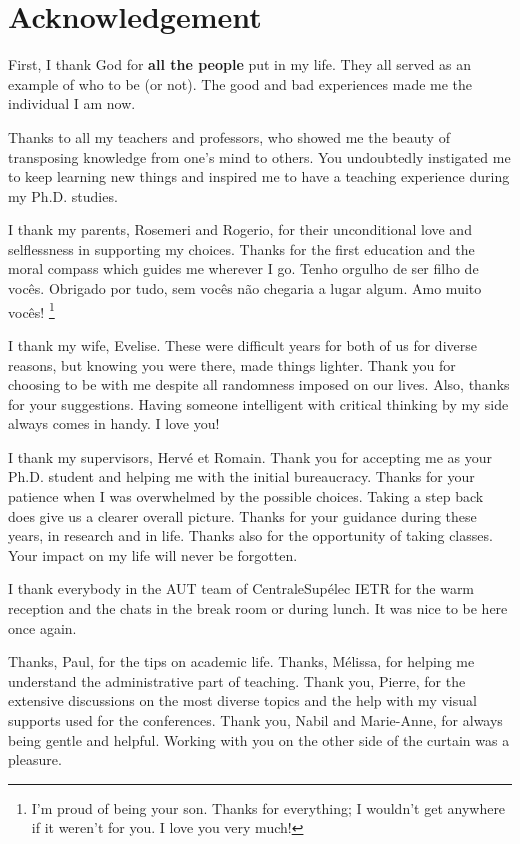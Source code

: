 \documentclass[../main.tex]{subfiles}
\begin{document}
\chapter*{Acknowledgement}

First, I thank God for \textbf{all the people} put in my life.
They all served as an example of who to be (or not).
The good and bad experiences made me the individual I am now.

Thanks to all my teachers and professors, who showed me the beauty of transposing knowledge from one's mind to others.
You undoubtedly instigated me to keep learning new things and inspired me to have a teaching experience during my Ph.D. studies.

I thank my parents, Rosemeri and Rogerio, for their unconditional love and selflessness in supporting my choices.
Thanks for the first education and the moral compass which guides me wherever I go. Tenho orgulho de ser filho de vocês. Obrigado por tudo, sem vocês não chegaria a lugar algum. Amo muito vocês! \footnote{I'm proud of being your son. Thanks for everything; I wouldn't get anywhere if it weren't for you. I love you very much!}

I thank my wife, Evelise.
These were difficult years for both of us for diverse reasons, but knowing you were there, made things lighter.
Thank you for choosing to be with me despite all randomness imposed on our lives.
Also, thanks for your suggestions. Having someone intelligent with critical thinking by my side always comes in handy.
I love you!

I thank my supervisors, Hervé et Romain.
Thank you for accepting me as your Ph.D. student and helping me with the initial bureaucracy.
Thanks for your patience when I was overwhelmed by the possible choices.
Taking a step back does give us a clearer overall picture.
Thanks for your guidance during these years, in research and in life.
Thanks also for the opportunity of taking classes.
Your impact on my life will never be forgotten.


I thank everybody in the AUT team of CentraleSupélec IETR for the warm reception and the chats in the break room or during lunch. It was nice to be here once again.

Thanks, Paul, for the tips on academic life.
Thanks, Mélissa, for helping me understand the administrative part of teaching.
Thank you, Pierre, for the extensive discussions on the most diverse topics and the help with my visual supports used for the conferences.
Thank you, Nabil and Marie-Anne, for always being gentle and helpful. Working with you on the other side of the curtain was a pleasure.
\end{document}
